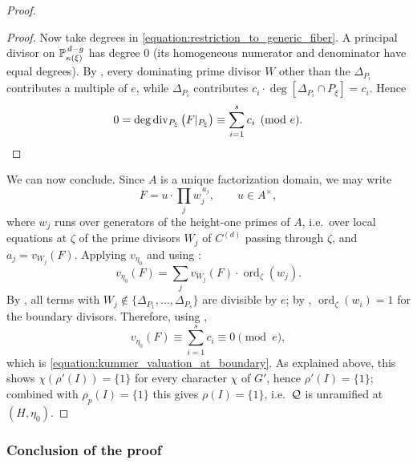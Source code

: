 \begin{proof}
\begin{proof}
        Now take degrees in \eqref{equation:restriction_to_generic_fiber}. A principal divisor on
        $\mathbb{P}^{\,d-g}_{\kappa(\xi)}$ has degree $0$ (its homogeneous numerator and denominator have equal
        degrees). By , every dominating prime divisor $W$ other than the
        $\Delta_{P_i}$ contributes a multiple of $e$, while $\Delta_{P_i}$ contributes
        $c_i \cdot \deg[\Delta_{P_i} \cap P_\xi] = c_i$. Hence
        \[ 0 = \deg \operatorname{div}_{P_\xi}\left( F|_{P_\xi} \right)
             \equiv \sum_{i=1}^{s} c_i \pmod{e}. \qedhere \]
    \end{proof}

    We can now conclude. Since $A$ is a unique factorization domain, we may write
    \[ F = u \cdot \prod_{j} w_j^{\,a_j}, \qquad u \in A^\times, \]
    where $w_j$ runs over generators of the height-one primes of $A$, i.e.\ over local equations at
    $\zeta$ of the prime divisors $W_j$ of $C^{(d)}$ passing through $\zeta$, and $a_j = v_{W_j}(F)$.
    Applying $v_{\eta_0}$ and using :
    \[ v_{\eta_0}(F) = \sum_j v_{W_j}(F) \cdot \operatorname{ord}_\zeta(w_j). \]
    By , all terms with $W_j \notin \{\Delta_{P_1}, \dots, \Delta_{P_s}\}$
    are divisible by $e$; by ,
    $\operatorname{ord}_\zeta(w_i) = 1$ for the boundary divisors. Therefore, using
    ,
    \[ v_{\eta_0}(F) \equiv \sum_{i=1}^{s} c_i \equiv 0 \pmod{e}, \]
    which is \eqref{equation:kummer_valuation_at_boundary}. As explained above, this shows
    $\chi(\rho'(I)) = \{1\}$ for every character $\chi$ of $G'$, hence $\rho'(I) = \{1\}$; combined
    with $\rho_p(I) = \{1\}$ this gives $\rho(I) = \{1\}$, i.e.\ $\mathcal{Q}$ is unramified at $(H, \eta_0)$.
\end{proof}

\subsubsection*{Conclusion of the proof}

